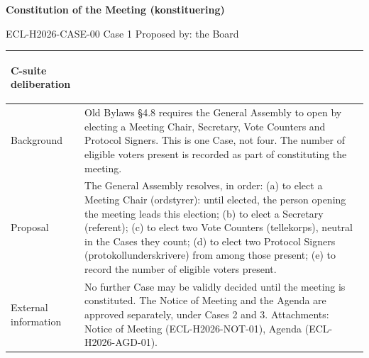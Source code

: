 \documentclass{../../../Common/Latex/Templates/rapport}
\begin{document}
\reportmainmatter
\small
\setlength{\parindent}{0pt}
\setlength{\tabcolsep}{6pt}
\renewcommand{\arraystretch}{1.2}

\begin{center}
  {\Large\bfseries Constitution of the Meeting (konstituering)}\par
  \vspace{0.15cm}
  {\normalsize ECL-H2026-CASE-00 \textperiodcentered{} Case 1 \textperiodcentered{} Proposed by: the Board}\par
  \vspace{0.1cm}
  {\small \meetingline}\par
\end{center}

\vspace{0.3cm}
\begin{tabularx}{\textwidth}{|>{\bfseries\raggedright\arraybackslash}p{4.2cm}|X|}
  \hline
  C-suite deliberation & \rule{0pt}{4.1cm} \\
  \hline
  Background           & Old Bylaws \S4.8 requires the General Assembly to open by electing a Meeting Chair, Secretary, Vote Counters and Protocol Signers. This is one Case, not four. The number of eligible voters present is recorded as part of constituting the meeting. \\
  \hline
  Proposal             & The General Assembly resolves, in order: (a) to elect a Meeting Chair (ordstyrer): until elected, the person opening the meeting leads this election; (b) to elect a Secretary (referent); (c) to elect two Vote Counters (tellekorps), neutral in the Cases they count; (d) to elect two Protocol Signers (protokollunderskrivere) from among those present; (e) to record the number of eligible voters present. \\
  \hline
  External information & No further Case may be validly decided until the meeting is constituted. The Notice of Meeting and the Agenda are approved separately, under Cases 2 and 3. Attachments: Notice of Meeting (ECL-H2026-NOT-01), Agenda (ECL-H2026-AGD-01). \\
  \hline
\end{tabularx}
\end{document}
